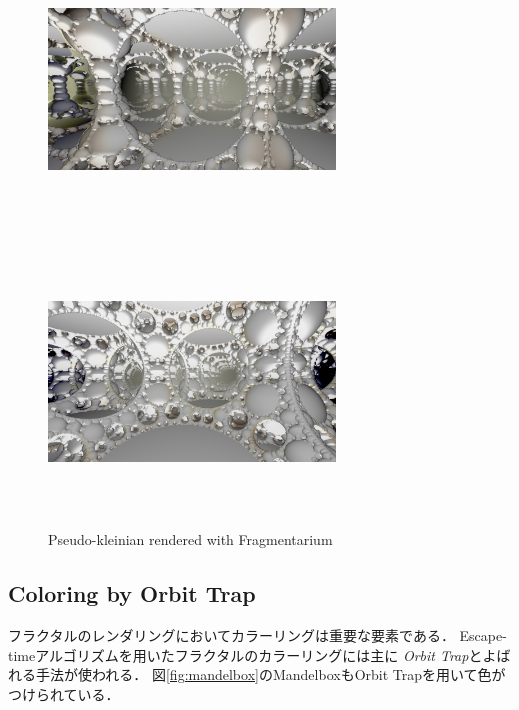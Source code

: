 \begin{figure}[htbp]
 \begin{minipage}{0.5\hsize}
  \center
  \includegraphics[width=3in, height=3in, keepaspectratio]{../img/fractal/pseudoKleinian.pdf}
  \subcaption{}
 \end{minipage}
 \begin{minipage}{0.5\hsize}
  \center
  \includegraphics[width=3in, height=3in,
  keepaspectratio]{../img/fractal/pseudo-kleinian2.pdf}
  \subcaption{}
 \end{minipage}
  \caption{Pseudo-kleinian rendered with Fragmentarium}
  \label{fig:pseudoKleinian}
\end{figure}


\subsection{Coloring by Orbit Trap}

フラクタルのレンダリングにおいてカラーリングは重要な要素である．
Escape-timeアルゴリズムを用いたフラクタルのカラーリングには主に\textit{
Orbit Trap}とよばれる手法が使われる．
図\ref{fig:mandelbox}のMandelboxもOrbit Trapを用いて色がつけられている．

